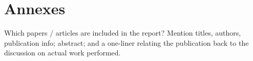 \documentclass[a4paper,11pt,pdf]{pacmanreport}
\begin{document}






\section{Annexes}

Which papers / articles are included in the report? Mention titles, authors, publication info; abstract; and a one-liner relating the publication back to the discussion on actual work performed.




\end{document}
